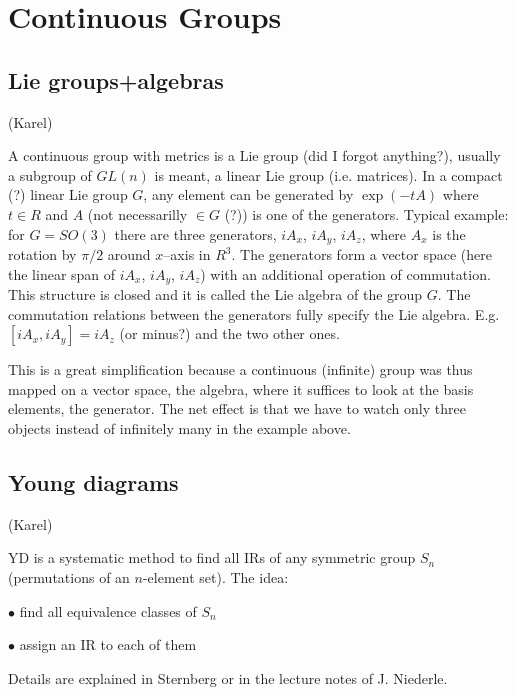 \chapter{Continuous Groups}

\section{Lie groups+algebras}

(Karel)

A continuous group with metrics is a Lie group (did I forgot anything?),
usually a subgroup of $GL(n)$ is meant, a linear Lie group (i.e. matrices). In
a compact (?) linear Lie group $G$, any element can be generated by
$\exp(-tA)$ where $t\in R$ and $A$ (not necessarilly $\in G$ (?)) is one of
the generators. Typical example: for $G=SO(3)$ there are three generators,
$iA_x$, $iA_y$, $iA_z$, where $A_x$ is the rotation by $\pi/2$ around
$x$--axis in $R^3$. The generators form a vector space (here the linear span
of $iA_x$, $iA_y$, $iA_z$) with an additional operation of
commutation. This structure is closed and it is called the Lie algebra of the
group $G$. The commutation relations between the generators fully specify the
Lie algebra. E.g. $[iA_x,iA_y]=iA_z$ (or minus?) and the two other ones.

This is a great simplification because a continuous (infinite) group was thus
mapped on a vector space, the algebra, where it suffices to look at the basis
elements, the generator. The net effect is that we have to watch only three
objects instead of infinitely many in the example above.



\section{Young diagrams}

(Karel)

YD is a systematic method to find all IRs of any symmetric group $S_n$
(permutations of an $n$-element set). The idea:

$\bullet$ find all equivalence classes of $S_n$

$\bullet$ assign an IR to each of them

\noindent
Details are explained in Sternberg or in the lecture notes of J. Niederle. 






